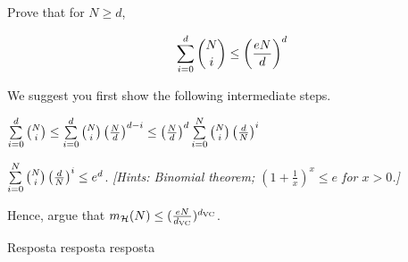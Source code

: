 \begin{enunciado}{6}
    Prove that for $N \ge d$,
    
    $$\sum\limits_{i=0}^{d} {{N} \choose {i}} \le \left( \frac{eN}{d} \right)^d$$
    
    We suggest you first show the following intermediate steps.
    
     $\sum\limits_{i=0}^{d}{{N} \choose {i}} \le 
    \sum\limits_{i=0}^{d}{{N} \choose {i}} \left( \frac{N}{d} \right)^{d-i} \le
    \left( \frac{N}{d} \right)^{d} \sum\limits_{i=0}^{N}{{N} \choose {i}} \left( \frac{d}{N} \right)^{i}$
    
     $\sum\limits_{i=0}^{N}{{N} \choose {i}} \left( \frac{d}{N} \right)^{i} \le e^d$. \textit{[Hints: Binomial theorem; $(1 + \frac{1}{x})^x \le e$ for $x > 0$.]}
    
    Hence, argue that $m_{\mathcal{H}}(N) \le (\frac{eN}{d_{\text{VC}}})^{d_{\text{VC}}}$.
\end{enunciado}

Resposta resposta resposta
